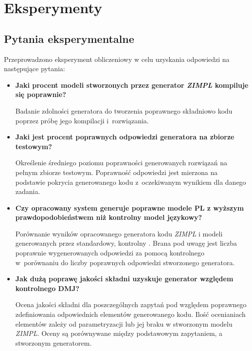 
\chapter{Eksperymenty}\label{ch:experiment}

\section{Pytania eksperymentalne}

Przeprowadzono eksperyment obliczeniowy w celu uzyskania odpowiedzi na następujące pytania:
\begin{itemize}
    \item \textbf{Jaki procent modeli stworzonych przez generator  \textit{ZIMPL} kompiluje się poprawnie?}

Badanie zdolności generatora do tworzenia poprawnego składniowo kodu poprzez próbę jego kompilacji i~rozwiązania.

    \item \textbf{Jaki jest procent poprawnych odpowiedzi generatora na zbiorze testowym?}

 Określenie średniego poziomu poprawności generowanych rozwiązań na pełnym zbiorze testowym. Poprawność odpowiedzi jest mierzona na podstawie pokrycia generowanego kodu z~oczekiwanym wynikiem dla danego zadania.
    
    \item \textbf{Czy opracowany system generuje poprawne modele PL z wyższym prawdopodobieństwem niż kontrolny model językowy?}

Porównanie wyników opracowanego generatora kodu  \textit{ZIMPL} i modeli generowanych przez standardowy, kontrolny . Brana pod uwagę jest liczba poprawnie wygenerowanych odpowiedzi za pomocą kontrolnego  w~porównaniu do liczby poprawnych odpowiedzi stworzonego generatora.
    
    \item \textbf{Jak dużą poprawę jakości składni uzyskuje generator względem kontrolnego DMJ?}

Ocena jakości składni dla poszczególnych zapytań pod względem poprawnego zdefiniowania odpowiednich elementów generowanego kodu. Ilość ocenianiach elementów zależy od parametryzacji lub jej braku w stworzonym modelu  \textit{ZIMPL}. Oceny są porównywane między podstawowym zapytaniem, a stworzonym generatorem.
    
\end{itemize}


